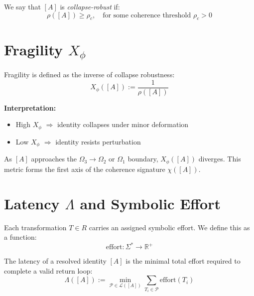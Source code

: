 We say that $[A]$ is \textit{collapse-robust} if:
\begin{equation} \label{eq:collapse-threshold}
\rho([A]) \geq \rho_c, \quad \text{for some coherence threshold } \rho_c > 0
\end{equation}

\section{Fragility $X_\phi$}

\begin{definition}[Fragility] \label{def:fragility}
Fragility is defined as the inverse of collapse robustness:
\begin{equation} \label{eq:fragility}
X_\phi([A]) := \frac{1}{\rho([A])}
\end{equation}
\end{definition}

\textbf{Interpretation:}
\begin{itemize}
  \item High $X_\phi$ $\Rightarrow$ identity collapses under minor deformation
  \item Low $X_\phi$ $\Rightarrow$ identity resists perturbation
\end{itemize}

As $[A]$ approaches the $\Omega_3 \rightarrow \Omega_2$ or $\Omega_1$ boundary, $X_\phi([A])$ diverges.  
This metric forms the first axis of the coherence signature $\chi([A])$.

\section{Latency $\Lambda$ and Symbolic Effort} \label{latency-lambda-and-symbolic-effort}

Each transformation $T \in R$ carries an assigned symbolic effort.  
We define this as a function:
\begin{equation} \label{eq:effort-function}
\text{effort} : \Sigma^* \rightarrow \mathbb{R}^+
\end{equation}

\begin{definition}[Latency] \label{def:latency}
The latency of a resolved identity $[A]$ is the minimal total effort required to complete a valid return loop:
\begin{equation} \label{eq:latency}
\Lambda([A]) := \min_{\mathcal{P} \in \mathcal{L}([A])} \sum_{T_i \in \mathcal{P}} \text{effort}(T_i)
\end{equation}
\end{definition}

